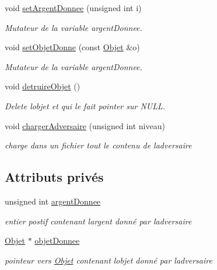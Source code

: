 \begin{DoxyCompactItemize}
void \hyperlink{class_adversaire_ab8371ffdc0fc9a934212e05fbf3fedc2}{set\+Argent\+Donnee} (unsigned int i)
\begin{DoxyCompactList}\small\item\em Mutateur de la variable argent\+Donnee. \end{DoxyCompactList}\item 
void \hyperlink{class_adversaire_a96bed950b5172bbda0a2ddab2b1ff68c}{set\+Objet\+Donne} (const \hyperlink{class_objet}{Objet} \&o)
\begin{DoxyCompactList}\small\item\em Mutateur de la variable argent\+Donnee. \end{DoxyCompactList}\item 
\mbox{\label{class_adversaire_ac0a12a8a849f87161ccc844cee731374}} 
void \hyperlink{class_adversaire_ac0a12a8a849f87161ccc844cee731374}{detruire\+Objet} ()
\begin{DoxyCompactList}\small\item\em Delete l\textquotesingle{}objet et qui le fait pointer sur N\+U\+LL. \end{DoxyCompactList}\item 
\mbox{\label{class_adversaire_a5540f25c07c308dcc31328501a980c1c}} 
void \hyperlink{class_adversaire_a5540f25c07c308dcc31328501a980c1c}{charger\+Adversaire} (unsigned int niveau)
\begin{DoxyCompactList}\small\item\em charge dans un fichier tout le contenu de l\textquotesingle{}adversaire \end{DoxyCompactList}\end{DoxyCompactItemize}
\subsection*{Attributs privés}
\begin{DoxyCompactItemize}
\item 
\mbox{\label{class_adversaire_a61c74ca96d42538068613e40a20229cf}} 
unsigned int \hyperlink{class_adversaire_a61c74ca96d42538068613e40a20229cf}{argent\+Donnee}
\begin{DoxyCompactList}\small\item\em entier postif contenant l\textquotesingle{}argent donné par l\textquotesingle{}adversaire \end{DoxyCompactList}\item 
\mbox{\label{class_adversaire_ad431344bd026692b52766f838ef999fb}} 
\hyperlink{class_objet}{Objet} $\ast$ \hyperlink{class_adversaire_ad431344bd026692b52766f838ef999fb}{objet\+Donnee}
\begin{DoxyCompactList}\small\item\em pointeur vers \hyperlink{class_objet}{Objet} contenant l\textquotesingle{}objet donné par l\textquotesingle{}adversaire \end{DoxyCompactList}\end{DoxyCompactItemize}


